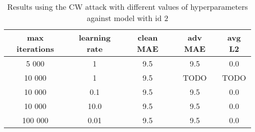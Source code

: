 \begin{table}[]
\begin{tabular}{|c|c|c|c|c|}
\hline
max iterations & learning rate & clean MAE & adv MAE & avg L2 \\ \hline
5 000 & 1 & 9.5 & 9.5 & 0.0 \\ \hline
10 000 & 1 & 9.5 & TODO & TODO \\ \hline
10 000 & 0.1 & 9.5 & 9.5 & 0.0 \\ \hline
10 000 & 10.0 & 9.5 & 9.5 & 0.0 \\ \hline
100 000 & 0.01 & 9.5 & 9.5 & 0.0 \\ \hline
\end{tabular}
\caption{Results using the CW attack with different values of hyperparameters against model with id 2}
\label{table:cw-results}
\end{table}